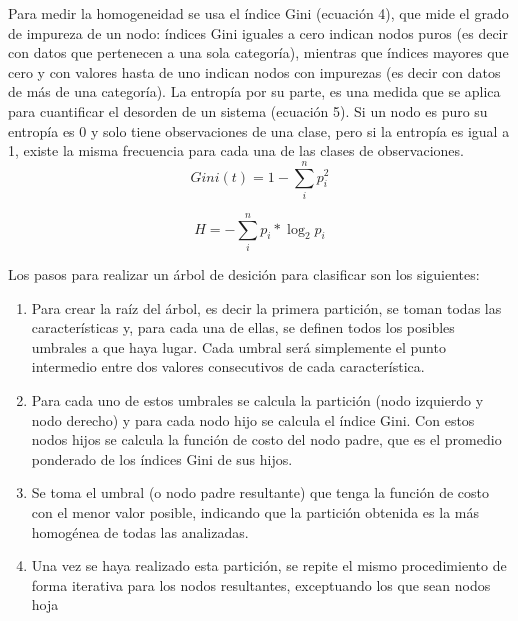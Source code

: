 \documentclass[conference]{IEEEtran}
\begin{document}
Para medir la homogeneidad se usa el índice Gini (ecuación 4), que mide el grado de impureza de un nodo: índices Gini iguales a cero indican nodos puros (es decir con datos que pertenecen a una sola categoría), mientras que índices mayores que cero y con valores hasta de uno indican nodos con impurezas (es decir con datos de más de una categoría). La entropía por su parte, es una medida que se aplica para cuantificar el desorden de un sistema (ecuación 5). Si un nodo es puro su entropía es 0 y solo tiene observaciones de una clase, pero si la entropía es igual a 1, existe la misma frecuencia para cada una de las clases de observaciones.
\begin{equation}
Gini(t)=1- \sum_{i}^{n}p_i^2
\end{equation}

\begin{equation}
H=- \sum_{i}^{n}p_i*\log_2p_i
\end{equation}

Los pasos para realizar un árbol de desición para clasificar son los siguientes: 
\begin{enumerate}

\item Para crear la raíz del árbol, es decir la primera partición, se toman todas las características y, para cada una de ellas, se definen todos los posibles umbrales a que haya lugar. Cada umbral será simplemente el punto intermedio entre dos valores consecutivos de cada característica.

\item Para cada uno de estos umbrales se calcula la partición (nodo izquierdo y nodo derecho) y para cada nodo hijo se calcula el índice Gini. Con estos nodos hijos se calcula la función de costo del nodo padre, que es el promedio ponderado de los índices Gini de sus hijos.

\item Se toma el umbral (o nodo padre resultante) que tenga la función de costo con el menor valor posible, indicando que la partición obtenida es la más homogénea de todas las analizadas.

\item Una vez se haya realizado esta partición, se repite el mismo procedimiento de forma iterativa para los nodos resultantes, exceptuando los que sean nodos hoja
\end{enumerate}
\end{document}
